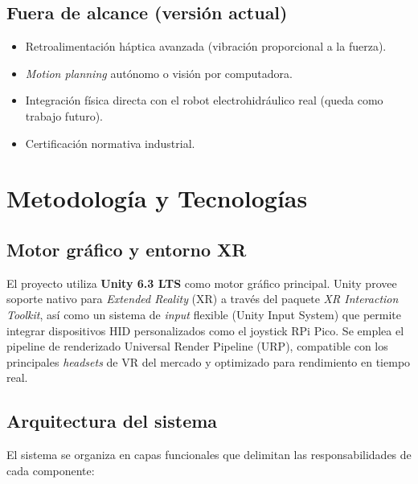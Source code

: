 \subsection{Fuera de alcance (versión actual)}

\begin{itemize}
    \item Retroalimentación háptica avanzada (vibración proporcional a la fuerza).
    \item \textit{Motion planning} autónomo o visión por computadora.
    \item Integración física directa con el robot electrohidráulico real (queda como trabajo futuro).
    \item Certificación normativa industrial.
\end{itemize}


\section{Metodología y Tecnologías}

\subsection{Motor gráfico y entorno XR}

El proyecto utiliza \textbf{Unity 6.3 LTS} como motor gráfico principal. Unity provee soporte nativo para \textit{Extended Reality} (XR) a través del paquete \textit{XR Interaction Toolkit}, así como un sistema de \textit{input} flexible (Unity Input System) que permite integrar dispositivos HID personalizados como el joystick RPi Pico. Se emplea el pipeline de renderizado Universal Render Pipeline (URP), compatible con los principales \textit{headsets} de VR del mercado y optimizado para rendimiento en tiempo real.

\subsection{Arquitectura del sistema}

El sistema se organiza en capas funcionales que delimitan las responsabilidades de cada componente:

